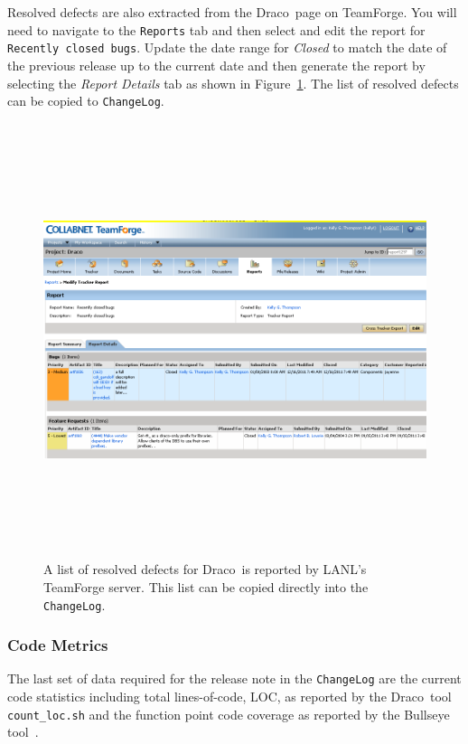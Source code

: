 \documentclass[note]{newmemo}
\newcommand{\draco}{{\normalfont\small\sffamily Draco}}
\begin{document}
Resolved defects are also extracted from the \draco\ page on
TeamForge.  You will need to navigate to the \texttt{Reports} tab and
then select and edit the report for \texttt{Recently closed bugs}.
Update the date range for \textit{Closed} to match the date of the
previous release up to the current date and then generate the report
by selecting the \textit{Report Details} tab as shown in
Figure~\ref{fig:sample-resolved-defect-list}.  The list of resolved
defects can be copied to \texttt{ChangeLog}.

\begin{figure}
  \centerline{ \includegraphics[height=5.0in, angle=90]
{sample-resolved-defect-list.png}}
  \caption{A list of resolved defects for \draco\ is reported by
    LANL's TeamForge server.  This list can be copied directly into
    the \texttt{ChangeLog}.}
  \label{fig:sample-resolved-defect-list}
\end{figure}


\subsubsection{Code Metrics}
\label{sec:code_metric}

The last set of data required for the release note in the
\texttt{ChangeLog} are the current code statistics including total
lines-of-code, LOC, as reported by the \draco\ tool
\texttt{count\_loc.sh} and the function point code coverage as
reported by the Bullseye tool~\cite{bullseyeweb}.
\end{document}

